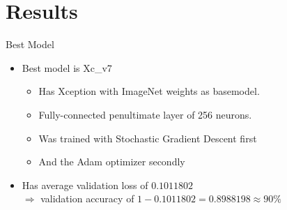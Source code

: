 \documentclass{beamer}
\makeatletter
\newcommand{\mlcell}[1]{\begin{tabular}{@{}c@{}}#1\end{tabular}}
\makeatother
\begin{document}
\section{Results}

\begin{frame}{Best Model}
\begin{itemize}
 \item Best model is Xc\_v7
  \begin{itemize}
    \item Has Xception with ImageNet weights as basemodel.
    \item Fully-connected penultimate layer of 256 neurons.
    \item Was trained with Stochastic Gradient Descent first 
    \item And the Adam optimizer secondly 
  \end{itemize}
 \item Has average validation loss of $0.1011802$ \\ $\Rightarrow$ validation accuracy of $ 1 - 0.1011802 = 0.8988198 \approx 90\%$
\end{itemize}
\end{frame}
\end{document}
